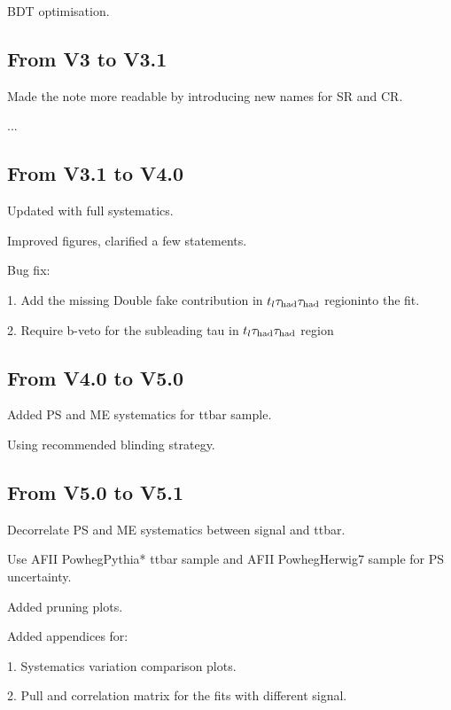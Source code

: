 BDT optimisation.

\subsection{From V3 to V3.1}

Made the note more readable by introducing new names for SR and CR.

...
\subsection{From V3.1 to V4.0}

Updated with full systematics.

Improved figures, clarified a few statements.

Bug fix:

1. Add the missing Double fake contribution in $t_l\tau_\text{had}\tau_\text{had}$ regioninto the fit.

2. Require b-veto for the subleading tau in $t_l\tau_\text{had}\tau_\text{had}$ region

\subsection{From V4.0 to V5.0}

Added PS and ME systematics for ttbar sample.

Using recommended blinding strategy.

\subsection{From V5.0 to V5.1}

Decorrelate PS and ME systematics between signal and ttbar.

Use AFII PowhegPythia* ttbar sample and AFII PowhegHerwig7 sample for PS uncertainty.

Added pruning plots.

Added appendices for:

1. Systematics variation comparison plots.

2. Pull and correlation matrix for the fits with different signal.